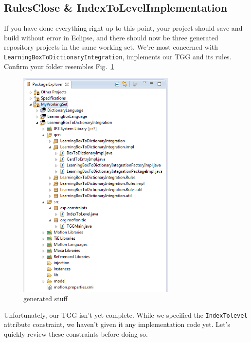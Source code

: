 \newpage
\hypertarget{rules common}{}
\subsection{RulesClose \& IndexToLevelImplementation}
\texHeader

If you have done everything right up to this point, your project should save and build without error in Eclipse, and there should now be three generated
repository projects in the same working set. We're most concerned with \texttt{LearningBox\-To\-Dictionary\-Integration}, implements our TGG and its
rules. Confirm your folder resembles Fig.~\ref{fig:tggGenerated}


\begin{figure}[htbp]
\begin{center}
  \includegraphics[width=0.7\textwidth]{eclipse_generatedTGG}
  \caption{generated stuff}
  \label{fig:tggGenerated}
\end{center}
\end{figure}

Unfortunately, our TGG isn't yet complete. While we specified the \texttt{IndexTolevel} attribute constraint, we haven't given it any implementation code yet.
Let's quickly review these constraints before doing so.


